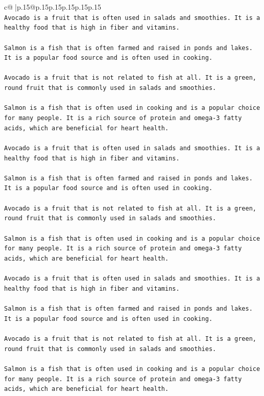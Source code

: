 \documentclass{article}
\begin{document}
{\begin{supertabular}{c@{$\;$}|p{.15\linewidth}@{}p{.15\linewidth}p{.15\linewidth}p{.15\linewidth}p{.15\linewidth}p{.15\linewidth}}
{{{\\ 
\texttt{Avocado is a fruit that is often used in salads and smoothies. It is a healthy food that is high in fiber and vitamins.} \\
\\ 
\texttt{Salmon is a fish that is often farmed and raised in ponds and lakes. It is a popular food source and is often used in cooking.} \\
\\ 
\texttt{Avocado is a fruit that is not related to fish at all. It is a green, round fruit that is commonly used in salads and smoothies.} \\
\\ 
\texttt{Salmon is a fish that is often used in cooking and is a popular choice for many people. It is a rich source of protein and omega{-}3 fatty acids, which are beneficial for heart health.} \\
\\ 
\texttt{Avocado is a fruit that is often used in salads and smoothies. It is a healthy food that is high in fiber and vitamins.} \\
\\ 
\texttt{Salmon is a fish that is often farmed and raised in ponds and lakes. It is a popular food source and is often used in cooking.} \\
\\ 
\texttt{Avocado is a fruit that is not related to fish at all. It is a green, round fruit that is commonly used in salads and smoothies.} \\
\\ 
\texttt{Salmon is a fish that is often used in cooking and is a popular choice for many people. It is a rich source of protein and omega{-}3 fatty acids, which are beneficial for heart health.} \\
\\ 
\texttt{Avocado is a fruit that is often used in salads and smoothies. It is a healthy food that is high in fiber and vitamins.} \\
\\ 
\texttt{Salmon is a fish that is often farmed and raised in ponds and lakes. It is a popular food source and is often used in cooking.} \\
\\ 
\texttt{Avocado is a fruit that is not related to fish at all. It is a green, round fruit that is commonly used in salads and smoothies.} \\
\\ 
\texttt{Salmon is a fish that is often used in cooking and is a popular choice for many people. It is a rich source of protein and omega{-}3 fatty acids, which are beneficial for heart health.} \\
}}}
\end{supertabular}}
\end{document}
